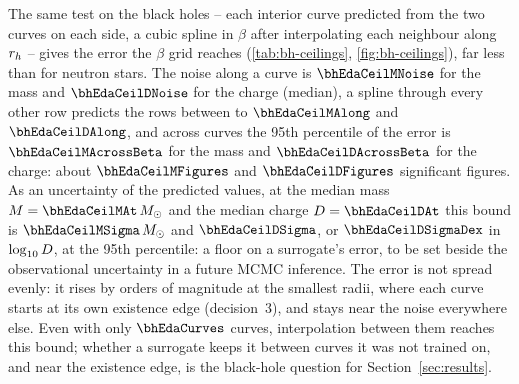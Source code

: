 The same test on the black holes -- each interior curve predicted from the two curves on each side, a cubic spline in $\beta$ after interpolating each neighbour along $r_h$ -- gives the error the $\beta$ grid reaches (\cref{tab:bh-ceilings}, \cref{fig:bh-ceilings}), far less than for neutron stars. The noise along a curve is $\bhEdaCeilMNoise$ for the mass and $\bhEdaCeilDNoise$ for the charge (median), a spline through every other row predicts the rows between to $\bhEdaCeilMAlong$ and $\bhEdaCeilDAlong$, and across curves the 95th percentile of the error is $\bhEdaCeilMAcrossBeta$ for the mass and $\bhEdaCeilDAcrossBeta$ for the charge: about $\bhEdaCeilMFigures$ and $\bhEdaCeilDFigures$ significant figures. As an uncertainty of the predicted values, at the median mass $M = \bhEdaCeilMAt\,\Msun$ and the median charge $\Dch = \bhEdaCeilDAt$ this bound is $\bhEdaCeilMSigma\,\Msun$ and $\bhEdaCeilDSigma$, or $\bhEdaCeilDSigmaDex$ in $\log_{10}D$, at the 95th percentile: a floor on a surrogate's error, to be set beside the observational uncertainty in a future MCMC inference. The error is not spread evenly: it rises by orders of magnitude at the smallest radii, where each curve starts at its own existence edge (decision~3), and stays near the noise everywhere else. Even with only $\bhEdaCurves$ curves, interpolation between them reaches this bound; whether a surrogate keeps it between curves it was not trained on, and near the existence edge, is the black-hole question for Section~\ref{sec:results}.

\FloatBarrier
{}
\FloatBarrier
{}
\FloatBarrier
